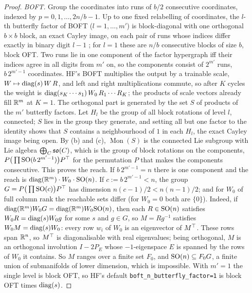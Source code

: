 \begin{proof}
\emph{BOFT.} Group the coordinates into runs of $b/2$ consecutive coordinates, indexed by $p=0,1,\dots,2n/b-1$. Up to one fixed
relabelling of coordinates, the $l$-th butterfly factor of BOFT ($l=1,\dots,m'$) is block-diagonal with one orthogonal
$b\times b$ block, an exact Cayley image, on each pair of runs whose indices differ exactly in binary digit $l-1$
\citep{liu2023parameter,dao2019learning}; for $l=1$ these are $n/b$ consecutive blocks of size $b$, block OFT. Two runs lie
in one component of the factor hypergraph iff their indices agree in all digits from $m'$ on, so the components consist of
$2^{m'}$ runs, $b\,2^{m'-1}$ coordinates. HF's BOFT multiplies the output by a trainable scale, $W\mapsto\operatorname{diag}(s)\,W\,R$, and
left and right multiplications commute, so after $K$ cycles the weight is $\operatorname{diag}(s_K\cdots s_1)\,W_0\,R_1\cdots R_K$; the
products of scale vectors already fill $\mathbb{R}^m$ at $K=1$. The orthogonal part is generated by the set $S$ of products of the
$m'$ butterfly factors. Let $H_l$ be the group of all block rotations of level $l$, connected; $S$ lies in the group they
generate, and setting all but one factor to the identity shows that $S$ contains a neighbourhood of $1$ in each $H_l$, the
exact Cayley image being open. By (b) and (c), $\operatorname{Mon}(S)$ is the connected Lie subgroup with Lie algebra
$\bigoplus_C\mathfrak{so}(C)$, which is the group of block rotations on the components, $P\big(\prod\mathrm{SO}(b\,2^{m'-1})\big)P^{\top}$ for the
permutation $P$ that makes the components consecutive. This proves the reach. If $b\,2^{m'-1}=n$ there is one component and
the reach is $\operatorname{diag}(\mathbb{R}^m)\cdot W_0\cdot\mathrm{SO}(n)$. If $c:=b\,2^{m'-1}<n$, the group $G=P\big(\prod\mathrm{SO}(c)\big)P^{\top}$ has dimension
$n(c-1)/2<n(n-1)/2$; and for $W_0$ of full column rank the reachable sets differ (for $W_0=0$ both are $\{0\}$). Indeed, if
$\operatorname{diag}(\mathbb{R}^m)W_0G=\operatorname{diag}(\mathbb{R}^m)W_0\mathrm{SO}(n)$, then each $R\in\mathrm{SO}(n)$ satisfies $W_0R=\operatorname{diag}(s)W_0g$ for some $s$ and $g\in G$, so
$M=Rg^{-1}$ satisfies $W_0M=\operatorname{diag}(s)W_0$: every row $w_i$ of $W_0$ is an eigenvector of $M^{\top}$. These rows span $\mathbb{R}^n$, so $M^{\top}$ is
diagonalisable with real eigenvalues; being orthogonal, $M$ is an orthogonal involution $I-2P_E$ whose $-1$-eigenspace $E$ is
spanned by the rows of $W_0$ it contains. So $M$ ranges over a finite set $F_0$, and $\mathrm{SO}(n)\subseteq F_0G$, a finite union
of submanifolds of lower dimension, which is impossible. With $m'=1$ the single level is block OFT, so HF's default
\texttt{boft\_n\_butterfly\_factor=1} is block OFT times $\operatorname{diag}(s)$.


\end{proof}
